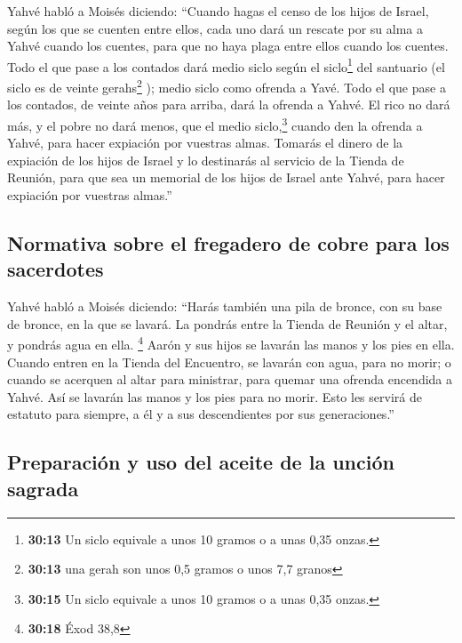 \begin{paracol}{2}
 Yahvé habló a Moisés diciendo:  ``Cuando
hagas el censo de los hijos de Israel, según los que se cuenten entre
ellos, cada uno dará un rescate por su alma a Yahvé cuando los cuentes,
para que no haya plaga entre ellos cuando los cuentes. 
Todo el que pase a los contados dará medio siclo según el
siclo\footnote{\textbf{30:13} Un siclo equivale a unos 10 gramos o a
  unas 0,35 onzas.} del santuario (el siclo es de veinte
gerahs\footnote{\textbf{30:13} una gerah son unos 0,5 gramos o unos 7,7
  granos} ); medio siclo como ofrenda a Yavé.  Todo el
que pase a los contados, de veinte años para arriba, dará la ofrenda a
Yahvé.  El rico no dará más, y el pobre no dará menos,
que el medio siclo,\footnote{\textbf{30:15} Un siclo equivale a unos 10
  gramos o a unas 0,35 onzas.} cuando den la ofrenda a Yahvé, para hacer
expiación por vuestras almas.  Tomarás el dinero de la
expiación de los hijos de Israel y lo destinarás al servicio de la
Tienda de Reunión, para que sea un memorial de los hijos de Israel ante
Yahvé, para hacer expiación por vuestras almas.''

\hypertarget{normativa-sobre-el-fregadero-de-cobre-para-los-sacerdotes}{%
\subsection{Normativa sobre el fregadero de cobre para los
sacerdotes}\label{normativa-sobre-el-fregadero-de-cobre-para-los-sacerdotes}}

 Yahvé habló a Moisés diciendo:  ``Harás
también una pila de bronce, con su base de bronce, en la que se lavará.
La pondrás entre la Tienda de Reunión y el altar, y pondrás agua en
ella. \footnote{\textbf{30:18} Éxod 38,8}  Aarón y sus
hijos se lavarán las manos y los pies en ella.  Cuando
entren en la Tienda del Encuentro, se lavarán con agua, para no morir; o
cuando se acerquen al altar para ministrar, para quemar una ofrenda
encendida a Yahvé.  Así se lavarán las manos y los pies
para no morir. Esto les servirá de estatuto para siempre, a él y a sus
descendientes por sus generaciones.''

\hypertarget{preparaciuxf3n-y-uso-del-aceite-de-la-unciuxf3n-sagrada}{%
\subsection{Preparación y uso del aceite de la unción
sagrada}\label{preparaciuxf3n-y-uso-del-aceite-de-la-unciuxf3n-sagrada}}


\end{paracol}
